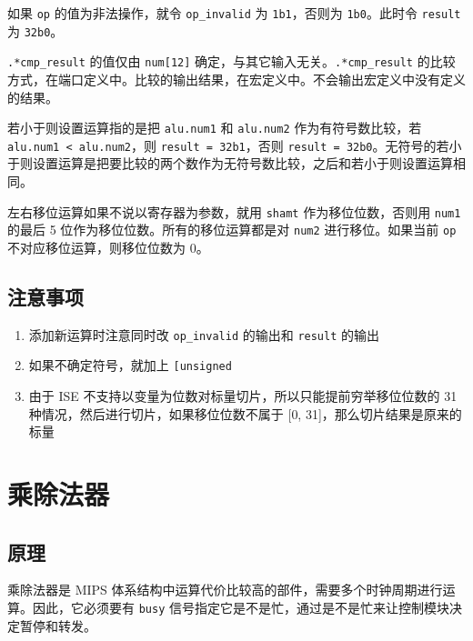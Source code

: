 \documentclass[12pt,AutoFakeBold,AutoFakeSlant]{article}
\providecommand{\tightlist}{%
  \setlength{\itemsep}{0pt}\setlength{\parskip}{0pt}}
\begin{document}
如果 \texttt{op} 的值为非法操作，就令 \texttt{op\_invalid} 为
\texttt{1\textquotesingle{}b1}，否则为
\texttt{1\textquotesingle{}b0}。此时令 \texttt{result} 为
\texttt{32\textquotesingle{}b0}。

\texttt{.*cmp\_result} 的值仅由 \texttt{num{[}12{]}}
确定，与其它输入无关。\texttt{.*cmp\_result}
的比较方式，在端口定义中。比较的输出结果，在宏定义中。不会输出宏定义中没有定义的结果。

若小于则设置运算指的是把 \texttt{alu.num1} 和 \texttt{alu.num2}
作为有符号数比较，若 \texttt{alu.num1\ \textless{}\ alu.num2}，则
\texttt{result\ =\ 32\textquotesingle{}b1}，否则
\texttt{result\ =\ 32\textquotesingle{}b0}。无符号的若小于则设置运算是把要比较的两个数作为无符号数比较，之后和若小于则设置运算相同。

左右移位运算如果不说以寄存器为参数，就用 \texttt{shamt}
作为移位位数，否则用 \texttt{num1} 的最后 5
位作为移位位数。所有的移位运算都是对 \texttt{num2} 进行移位。如果当前
\texttt{op} 不对应移位运算，则移位位数为 0。

\hypertarget{ux6ce8ux610fux4e8bux9879-4}{%
\subsection{注意事项}\label{ux6ce8ux610fux4e8bux9879-4}}

\begin{enumerate}
\def\labelenumi{\arabic{enumi}.}
\tightlist
\item
  添加新运算时注意同时改 \texttt{op\_invalid} 的输出和 \texttt{result}
  的输出
\item
  如果不确定符号，就加上 \texttt{{[}un\textbar{}{]}signed}
\item
  由于 ISE 不支持以变量为位数对标量切片，所以只能提前穷举移位位数的 31
  种情况，然后进行切片，如果移位位数不属于 {[}0,
  31{]}，那么切片结果是原来的标量
\end{enumerate}

\hypertarget{ux4e58ux9664ux6cd5ux5668}{%
\section{乘除法器}\label{ux4e58ux9664ux6cd5ux5668}}

\hypertarget{ux539fux7406-6}{%
\subsection{原理}\label{ux539fux7406-6}}

乘除法器是 MIPS
体系结构中运算代价比较高的部件，需要多个时钟周期进行运算。因此，它必须要有
\texttt{busy}
信号指定它是不是忙，通过是不是忙来让控制模块决定暂停和转发。
\end{document}
